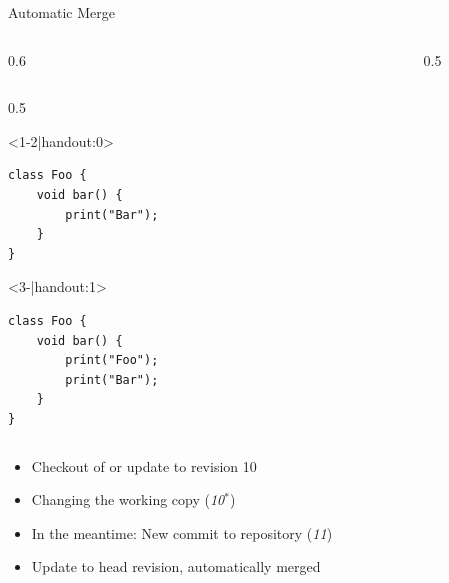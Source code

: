 \begin{frame}[fragile]{Automatic Merge}
\begin{columns}[onlytextwidth]
\begin{column}{0.6\linewidth}
\begin{columns}[T]
\begin{column}{0.5\linewidth}
					\begin{onlyenv}
						\begin{lstlisting}[style=java,basicstyle=\fontfamily{pcr}\small\selectfont,numbers=none,escapechar=|]
class Foo {
	void bar() {
		print("Bar");
	}
}
						\end{lstlisting}
					\end{onlyenv}
					\begin{onlyenv}
						\begin{lstlisting}[style=java,basicstyle=\fontfamily{pcr}\small\selectfont,numbers=none,escapechar=|]
class Foo {
	void bar() {
		print("Foo");
		print("Bar");
	}
}
						\end{lstlisting}
					\end{onlyenv}
				\end{column}
			\end{columns}

			\begin{example}{}
				\begin{itemize}
					\item<1-> Checkout of or update to revision 10
					\item<2-> Changing the working copy (\emph{10$^*$})
					\item<3-> In the meantime: New commit to repository (\emph{11})
					\item<4-> Update to head revision, automatically merged
				\end{itemize}
			\end{example}
		\end{column}
		\begin{column}{0.5\linewidth}
		\end{column}
	\end{columns}
\end{frame}

